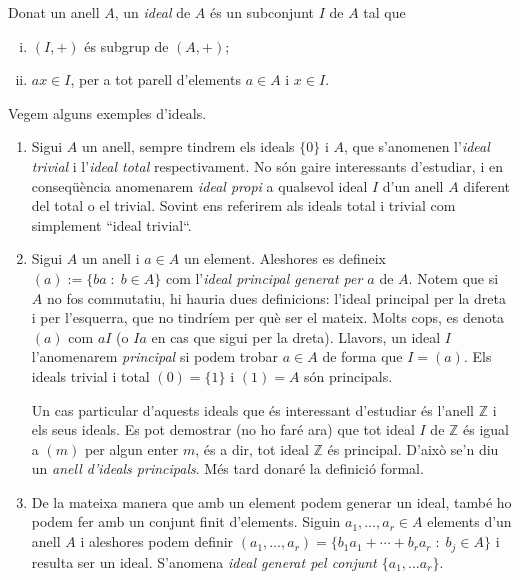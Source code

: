 \documentclass[../main.tex]{subfiles}
\begin{document}
\begin{defi}
[Ideal]\label{def:ideal} Donat un anell $A$, un \textit{ideal} de $A$ és un subconjunt $I$ de $A$ tal que
\begin{enumerate}[(i)]
    \item $(I,+)$ és subgrup de $(A,+)$;
    \item $ax\in I$, per a tot parell d'elements $a\in A$ i $x\in I$.
\end{enumerate}
\end{defi}

\begin{ej}
Vegem alguns exemples d'ideals.
\begin{enumerate}[(1)]
    \item Sigui $A$ un anell, sempre tindrem els ideals $\{0\}$ i $A$, que s'anomenen l'\textit{ideal trivial} i l'\textit{ideal total} respectivament. No són gaire interessants d'estudiar, i en conseqüència anomenarem \textit{ideal propi} a qualsevol ideal $I$ d'un anell $A$ diferent del total o el trivial. Sovint ens referirem als ideals total i trivial com simplement ``ideal trivial``.
    \item Sigui $A$ un anell i $a\in A$ un element. Aleshores es defineix $(a):=\{ba\;:\;b\in A\}$ com l'\textit{ideal principal generat per $a$} de $A$. Notem que si $A$ no fos commutatiu, hi hauria dues definicions: l'ideal principal per la dreta i per l'esquerra, que no tindríem per què ser el mateix. Molts cops, es denota $(a)$ com $aI$ (o $Ia$ en cas que sigui per la dreta). Llavors, un ideal $I$ l'anomenarem \textit{principal} si podem trobar $a\in A$ de forma que $I = (a)$. Els ideals trivial i total $(0) = \{1\}$ i $(1) = A$ són principals.
    
    Un cas particular d'aquests ideals que és interessant d'estudiar és l'anell $\mathbb{Z}$ i els seus ideals. Es pot demostrar (no ho faré ara) que tot ideal $I$ de $\mathbb{Z}$ és igual a $(m)$ per algun enter $m$, és a dir, tot ideal $\mathbb{Z}$ és principal. D'això se'n diu un \textit{anell d'ideals principals}. Més tard donaré la definició formal.
    
    \item De la mateixa manera que amb un element podem generar un ideal, també ho podem fer amb un conjunt finit d'elements. Siguin $a_1,\ldots,a_r\in A$ elements d'un anell $A$ i aleshores podem definir $(a_1,\ldots,a_r) = \{b_1a_1+\cdots+b_ra_r\;:\;b_j\in A\}$ i resulta ser un ideal. S'anomena \textit{ideal generat pel conjunt $\{a_1,\ldots a_r\}$}.
\end{enumerate}
\end{ej}
\end{document}
